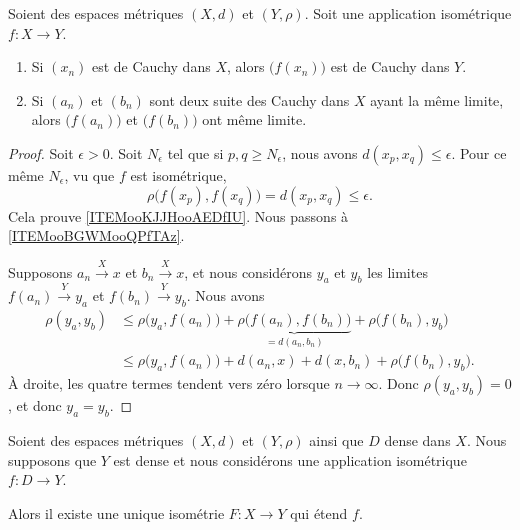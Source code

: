 \begin{lemma}     \label{LEMooGJONooVwUgyv}
	Soient des espaces métriques \( (X,d)\) et \( (Y,\rho)\). Soit une application isométrique \( f\colon X\to Y\).
	\begin{enumerate}
		\item       \label{ITEMooKJJHooAEDfIU}
		      Si \( (x_n)\) est de Cauchy dans \( X\), alors \( \big( f(x_n) \big)\) est de Cauchy dans \( Y\).
		\item       \label{ITEMooBGWMooQPfTAz}
		      Si \( (a_n)\) et \( (b_n)\) sont deux suite des Cauchy dans \( X\) ayant la même limite, alors \( \big( f(a_n) \big)\) et \( \big( f(b_n) \big)\) ont même limite.
	\end{enumerate}
\end{lemma}

\begin{proof}
	Soit \( \epsilon>0\). Soit \( N_{\epsilon}\) tel que si \( p,q\geq N_{\epsilon}\), nous avons \( d(x_p,x_q)\leq \epsilon\). Pour ce même \( N_{\epsilon}\), vu que \( f\) est isométrique,
	\begin{equation}
		\rho\big( f(x_p),f(x_q) \big) = d(x_p,x_q)\leq \epsilon.
	\end{equation}
	Cela prouve \ref{ITEMooKJJHooAEDfIU}. Nous passons à \ref{ITEMooBGWMooQPfTAz}.

	Supposons \( a_n\stackrel{X}{\longrightarrow}x\) et \( b_n\stackrel{X}{\longrightarrow}x\), et nous considérons \( y_a\) et \( y_b\) les limites \( f(a_n)\stackrel{Y}{\longrightarrow}y_a\) et \( f(b_n)\stackrel{Y}{\longrightarrow}y_b\). Nous avons
	\begin{subequations}
		\begin{align}
			\rho(y_a,y_b) & \leq \rho\big( y_a,f(a_n) \big)+\underbrace{\rho\big( f(a_n),f(b_n) \big)}_{=d(a_n,b_n)}+\rho\big( f(b_n),y_b \big) \\
			              & \leq \rho\big( y_a,f(a_n) \big)+d(a_n,x)+d(x,b_n)+\rho\big( f(b_n),y_b \big).
		\end{align}
	\end{subequations}
	À droite, les quatre termes tendent vers zéro lorsque \( n\to \infty\). Donc \( \rho(y_a,y_b)=0\), et donc \( y_a=y_b\).
\end{proof}


\begin{lemma}     \label{LEMooNFIOooZUMhuA}
	Soient des espaces métriques \( (X,d)\) et \( (Y,\rho)\) ainsi que \( D\) dense dans \( X\). Nous supposons que \( Y\) est dense et nous considérons une application isométrique \( f\colon D\to Y\).

	Alors il existe une unique isométrie \( F\colon X\to Y\) qui étend \( f\).
\end{lemma}

